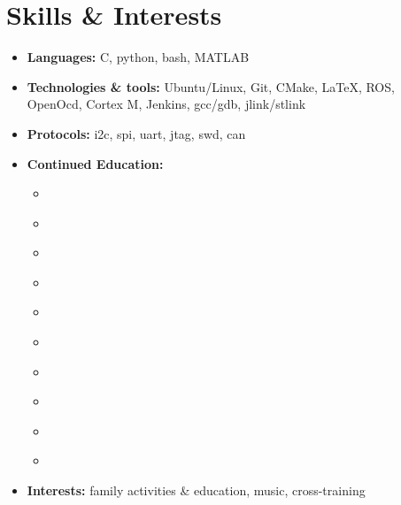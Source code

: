 \documentclass[letterpaper,11pt]{article}
\def\vspaceAfterBullets{3.5pt} %
\def\bulletIndent{20pt} %
\newcommand{\bulletItem}[1]{
  \item\small{
    {#1}
  }
}
\newcommand{\sectionListStart}{\begin{itemize}[leftmargin=0pt, label={}]}
\newcommand{\sectionListEnd}{\end{itemize}}
\newcommand{\outerBulletListStart}{\begin{itemize}[leftmargin=\bulletIndent]}
\newcommand{\outerBulletListEnd}{\end{itemize}\vspace{\vspaceAfterBullets}}
\newcommand{\bref}[2]{\href{#1}{\color{blue}{#2}}}
\begin{document}
\section{Skills \& Interests}
\sectionListStart
\bulletItem{\textbf{Languages:}{ C, python, bash, MATLAB}}
\vspace{\vspaceAfterBullets}
\bulletItem{\textbf{Technologies \& tools:}{ Ubuntu/Linux, Git, CMake, \LaTeX, ROS, OpenOcd, Cortex M, Jenkins, gcc/gdb, jlink/stlink}}
\vspace{\vspaceAfterBullets}
\bulletItem{\textbf{Protocols:}{ i2c, spi, uart, jtag, swd, can}}
\vspace{\vspaceAfterBullets}
\bulletItem{\textbf{Continued Education:}}
\outerBulletListStart
\bulletItem{\bref{https://www.udemy.com/course/mastering-rtos-hands-on-with-freertos-arduino-and-stm32fx/}{Mastering RTOS: Hands on FreeRTOS and STM32Fx with Debugging}}
\bulletItem{\bref{https://www.udemy.com/course/bash-mastery/?kw=Bash+Mastery\%3A+The+Complete+Guide+to+Bash+Shell+Scriptin&src=sac}{Bash Mastery: The Complete Guide to Bash Shell Scripting}}
\bulletItem{\bref{https://www.udemy.com/course/embedded-system-programming-on-arm-cortex-m3m4/}{Embedded Systems Programming on ARM Cortex-M3 M4 Processor}}
\bulletItem{\bref{https://www.udemy.com/course/microcontroller-programming-stm32-timers-pwm-can-bus-protocol/}{Mastering Microcontroller: Timers, PWM, CAN, Low Power (MCU2)}}
\bulletItem{\bref{https://www.udemy.com/course/embedded-linux-step-by-step-using-beaglebone/}{Embedded Linux Step by Step Using Beaglebone Black}}
\bulletItem{\bref{https://www.udemy.com/course/complete-python-bootcamp/}{The Complete Python Bootcamp From Zero to Hero in Python}}
\bulletItem{\bref{https://www.udemy.com/course/git-complete}{Git Complete: The definitive, step-by-step guide to Git}}
\bulletItem{\bref{https://www.udemy.com/course/mastering-microcontroller-with-peripheral-driver-development/?kw=Mastering+Microcontroller+and+Embedded+Driver+Development&src=sac}{Mastering Microcontroller and Embedded Driver Development}}
\bulletItem{\bref{https://www.udemy.com/course/stm32f4-arm-cortex-mx-custom-bootloader-development/?couponCode=25BBPMXINACTIVE}{STM32Fx Microcontroller Custom Bootloader Development}}
\bulletItem{\bref{https://www.udemy.com/course/microcontroller-embedded-c-programming/?kw=Microcontroller+Embedded+C+Programming\%3A+absolute+beginners&src=sac}{Microcontroller Embedded C Programming: Absolute Beginners}}


\outerBulletListEnd
\vspace{\vspaceAfterBullets}
\bulletItem{\textbf{Interests:}{ family activities \& education, music, cross-training}}
\sectionListEnd
\vspace{1em} %
\end{document}
